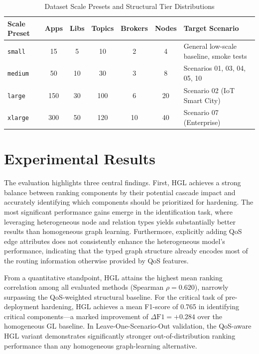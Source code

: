 \documentclass[sigconf,9pt,anonymous]{acmart}
\begin{document}
\begin{table}[t]
\centering
\caption{Dataset Scale Presets and Structural Tier Distributions}
\label{tab:dataset_scales}
\small
\begin{tabularx}{\columnwidth}{l c c c c c l}
\toprule
\textbf{Scale Preset} & \textbf{Apps} & \textbf{Libs} & \textbf{Topics} & \textbf{Brokers} & \textbf{Nodes} & \textbf{Target Scenario} \\
\midrule
\texttt{small}  & 15  & 5   & 10  & 2  & 4  & General low-scale baseline, smoke tests \\
\texttt{medium} & 50  & 10  & 30  & 3  & 8  & Scenarios 01, 03, 04, 05, 10 \\
\texttt{large}  & 150 & 30  & 100 & 6  & 20 & Scenario 02 (IoT Smart City) \\
\texttt{xlarge}  & 300 & 50  & 120 & 10 & 40 & Scenario 07 (Enterprise) \\
\bottomrule
\end{tabularx}
\vspace{1pt}
\begin{minipage}{\columnwidth}
\end{minipage}
\end{table}

\section{Experimental Results}

The evaluation highlights three central findings. First, HGL achieves a strong balance between ranking components by their potential cascade impact and accurately identifying which components should be prioritized for hardening. The most significant performance gains emerge in the identification task, where leveraging heterogeneous node and relation types yields substantially better results than homogeneous graph learning. Furthermore, explicitly adding QoS edge attributes does not consistently enhance the heterogeneous model’s performance, indicating that the typed graph structure already encodes most of the routing information otherwise provided by QoS features.

From a quantitative standpoint, HGL attains the highest mean ranking correlation among all evaluated methods (Spearman $\rho=0.620$), narrowly surpassing the QoS-weighted structural baseline. For the critical task of pre-deployment hardening, HGL achieves a mean F1-score of 0.765 in identifying critical components—a marked improvement of $\Delta\text{F1}=+0.284$ over the homogeneous GL baseline. In Leave-One-Scenario-Out validation, the QoS-aware HGL variant demonstrates significantly stronger out-of-distribution ranking performance than any homogeneous graph-learning alternative.
\end{document}
